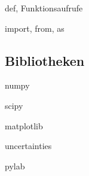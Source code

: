 \documentclass[t]{beamer}
\begin{document}
      \begin{frame}{def, Funktionsaufrufe}
      \end{frame}
      
      \begin{frame}{import, from, as}
      \end{frame}
    
    \subsection{Bibliotheken}
      \begin{frame}{numpy}
      \end{frame}
      
      \begin{frame}{scipy}
      \end{frame}
      
      \begin{frame}{matplotlib}
      \end{frame}
      
      \begin{frame}{uncertainties}
      \end{frame}
      
      \begin{frame}{pylab}
      \end{frame}
\end{document}

